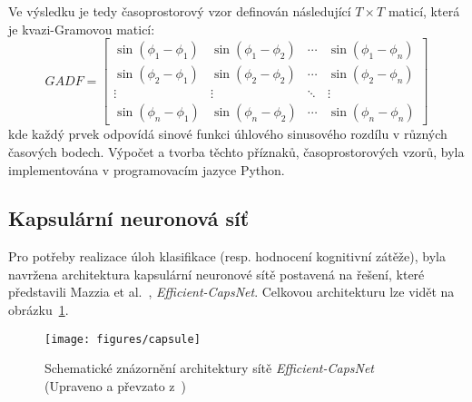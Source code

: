 Ve výsledku je tedy časoprostorový vzor definován následující $T \times T$
maticí, která je kvazi-Gramovou maticí:
\begin{equation}
    GADF = \left[\begin{array}{cccc}
            \sin \left(\phi_1-\phi_1\right) & \sin \left(\phi_1-\phi_2\right) & \cdots & \sin \left(\phi_1-\phi_n\right) \\
            \sin \left(\phi_2-\phi_1\right) & \sin \left(\phi_2-\phi_2\right) & \cdots & \sin \left(\phi_2-\phi_n\right) \\
            \vdots                          & \vdots                          & \ddots & \vdots                          \\
            \sin \left(\phi_n-\phi_1\right) & \sin \left(\phi_n-\phi_2\right) & \cdots & \sin \left(\phi_n-\phi_n\right)
        \end{array}\right]
\end{equation}
kde každý prvek odpovídá sinové funkci úhlového sinusového rozdílu v různých
časových bodech. Výpočet a tvorba těchto příznaků, časoprostorových vzorů, byla
implementována v programovacím jazyce Python.

\subsection{Kapsulární neuronová síť}
\label{subsec:kapsularni_sit}
Pro potřeby realizace úloh klasifikace (resp. hodnocení kognitivní zátěže), byla
navržena architektura kapsulární neuronové sítě postavená na řešení, které
představili Mazzia et al.~\cite{Mazzia2021}, \textit{Efficient-CapsNet}.
Celkovou architekturu lze vidět na obrázku~\ref{fig:architektura}.

\begin{figure}[h]
    \begin{center}
        \texttt{[image: figures/capsule]}
        \caption{Schematické znázornění architektury sítě
            \textit{Efficient-CapsNet} (Upraveno a převzato z~\cite{Zhou2021})}
        \label{fig:architektura}
    \end{center}
\end{figure}


